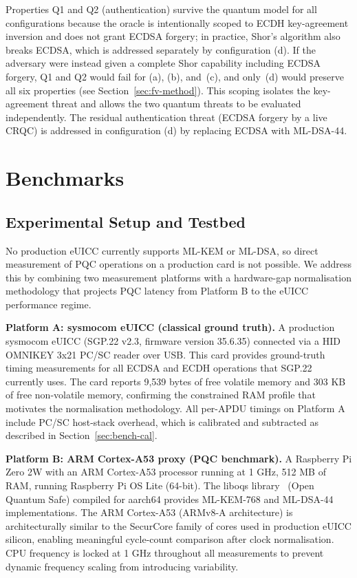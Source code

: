 \documentclass[a4paper,fleqn]{cas-sc}
\begin{document}
Properties Q1 and Q2 (authentication) survive the quantum model for all
configurations because the oracle is intentionally scoped to ECDH
key-agreement inversion and does not grant ECDSA forgery; in practice,
Shor's algorithm also breaks ECDSA, which is addressed separately by
configuration (d). If the adversary were instead given a complete Shor
capability including ECDSA forgery, Q1 and Q2 would fail for (a), (b),
and~(c), and only~(d) would preserve all six properties (see
Section~\ref{sec:fv-method}). This scoping isolates the key-agreement threat
and allows the two quantum threats to be evaluated independently. The
residual authentication threat (ECDSA forgery by a live CRQC) is addressed
in configuration (d) by replacing ECDSA with ML-DSA-44.

\section{Benchmarks}
\label{sec:benchmarks}

\subsection{Experimental Setup and Testbed}
\label{sec:bench-setup}

No production eUICC currently supports ML-KEM or ML-DSA, so direct
measurement of PQC operations on a production card is not possible. We
address this by combining two measurement platforms with a
hardware-gap normalisation methodology that projects PQC latency from
Platform B to the eUICC performance regime.

\textbf{Platform A: sysmocom eUICC (classical ground truth).} A
production sysmocom eUICC (SGP.22 v2.3, firmware version 35.6.35)
connected via a HID OMNIKEY 3x21 PC/SC reader over USB. This card
provides ground-truth timing measurements for all ECDSA and ECDH
operations that SGP.22 currently uses. The card reports 9,539 bytes of
free volatile memory and 303 KB of free non-volatile memory, confirming
the constrained RAM profile that motivates the normalisation methodology.
All per-APDU timings on Platform A include PC/SC host-stack overhead,
which is calibrated and subtracted as described in
Section~\ref{sec:bench-cal}.

\textbf{Platform B: ARM Cortex-A53 proxy (PQC benchmark).} A Raspberry
Pi Zero 2W with an ARM Cortex-A53 processor running at 1 GHz, 512 MB of
RAM, running Raspberry Pi OS Lite (64-bit). The liboqs library~\cite{oqs2024}
(Open Quantum Safe) compiled for aarch64 provides ML-KEM-768 and ML-DSA-44
implementations. The ARM Cortex-A53 (ARMv8-A architecture) is
architecturally similar to the SecurCore family of cores used in
production eUICC silicon, enabling meaningful cycle-count comparison
after clock normalisation. CPU frequency is locked at 1 GHz throughout
all measurements to prevent dynamic frequency scaling from introducing
variability.
\end{document}
